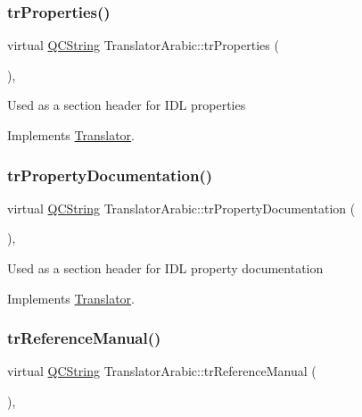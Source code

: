 \subsubsection{\texorpdfstring{trProperties()}{trProperties()}}
{\footnotesize\ttfamily virtual \mbox{\hyperlink{class_q_c_string}{Q\+C\+String}} Translator\+Arabic\+::tr\+Properties (\begin{DoxyParamCaption}{ }\end{DoxyParamCaption})\hspace{0.3cm}{\ttfamily [inline]}, {\ttfamily [virtual]}}

Used as a section header for I\+DL properties 

Implements \mbox{\hyperlink{class_translator}{Translator}}.

\mbox{\label{class_translator_arabic_ab071310a2ae9e45b495d83fd4eb44f9e}} 
\subsubsection{\texorpdfstring{trPropertyDocumentation()}{trPropertyDocumentation()}}
{\footnotesize\ttfamily virtual \mbox{\hyperlink{class_q_c_string}{Q\+C\+String}} Translator\+Arabic\+::tr\+Property\+Documentation (\begin{DoxyParamCaption}{ }\end{DoxyParamCaption})\hspace{0.3cm}{\ttfamily [inline]}, {\ttfamily [virtual]}}

Used as a section header for I\+DL property documentation 

Implements \mbox{\hyperlink{class_translator}{Translator}}.

\mbox{\label{class_translator_arabic_a7ced5f4c01b62f92c8bca76004b75a11}} 
\subsubsection{\texorpdfstring{trReferenceManual()}{trReferenceManual()}}
{\footnotesize\ttfamily virtual \mbox{\hyperlink{class_q_c_string}{Q\+C\+String}} Translator\+Arabic\+::tr\+Reference\+Manual (\begin{DoxyParamCaption}{ }\end{DoxyParamCaption})\hspace{0.3cm}{\ttfamily [inline]}, {\ttfamily [virtual]}}

